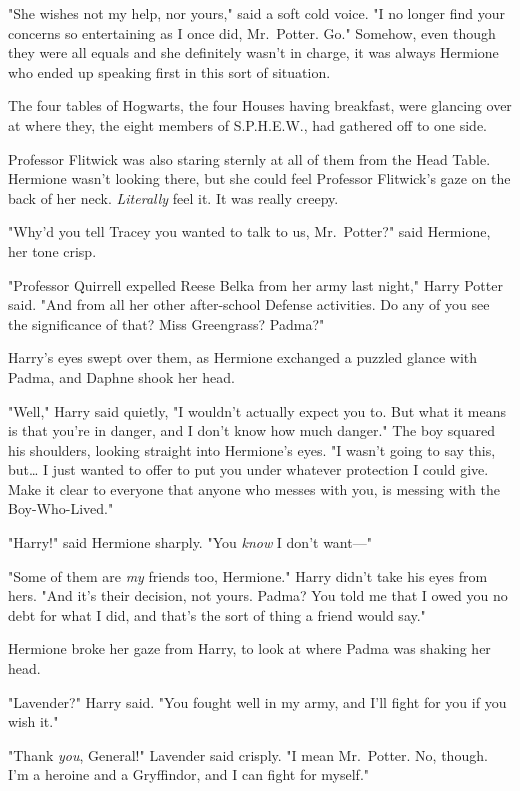 "She wishes not my help, nor yours," said a soft cold voice. "I no longer find 
your concerns so entertaining as I once did, Mr.~Potter. Go."
\sbreak
Somehow, even though they were all equals and she definitely wasn't in charge, 
it was always Hermione who ended up speaking first in this sort of situation.

The four tables of Hogwarts, the four Houses having breakfast, were glancing 
over at where they, the eight members of S.P.H.E.W., had gathered off to one 
side.

Professor Flitwick was also staring sternly at all of them from the Head Table. 
Hermione wasn't looking there, but she could feel Professor Flitwick's gaze on 
the back of her neck. \emph{Literally} feel it. It was really creepy.

"Why'd you tell Tracey you wanted to talk to us, Mr.~Potter?" said Hermione, 
her tone crisp.

"Professor Quirrell expelled Reese Belka from her army last night," Harry 
Potter said. "And from all her other after-school Defense activities. Do any of 
you see the significance of that? Miss Greengrass? Padma?"

Harry's eyes swept over them, as Hermione exchanged a puzzled glance with 
Padma, and Daphne shook her head.

"Well," Harry said quietly, "I wouldn't actually expect you to. But what it 
means is that you're in danger, and I don't know how much danger." The boy 
squared his shoulders, looking straight into Hermione's eyes. "I wasn't going 
to say this, but{\ldots} I just wanted to offer to put you under whatever 
protection I could give. Make it clear to everyone that anyone who messes with 
you, is messing with the Boy-Who-Lived."

"Harry!" said Hermione sharply. "You \emph{know} I don't want---"

"Some of them are \emph{my} friends too, Hermione." Harry didn't take his eyes 
from hers. "And it's their decision, not yours. Padma? You told me that I owed 
you no debt for what I did, and that's the sort of thing a friend would say."

Hermione broke her gaze from Harry, to look at where Padma was shaking her head.

"Lavender?" Harry said. "You fought well in my army, and I'll fight for you if 
you wish it."

"Thank \emph{you}, General!" Lavender said crisply. "I mean Mr.~Potter. No, 
though. I'm a heroine and a Gryffindor, and I can fight for myself."

